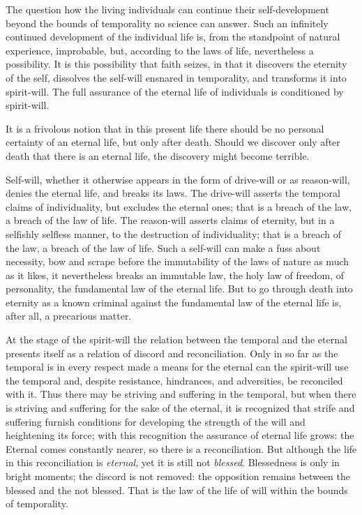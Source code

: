 \documentclass[12pt,a4paper,openany]{book}
\newcommand{\opage}[1]{\marginnote{\footnotesize\textit{[#1]}}}
\begin{document}
The question how the living individuals can
continue their self-development beyond the bounds of temporality
no science can answer. Such an infinitely
continued development of the individual life is, from the standpoint of
natural experience, improbable, but, according to the
laws of life, nevertheless a possibility. It is this possibility
that faith seizes, in that it discovers the eternity of the self, dissolves
the self-will ensnared in temporality, and transforms it into
spirit-will. The full assurance of the eternal life
of individuals is conditioned by spirit-will.

It is a frivolous notion that in this present life there
should be no personal certainty of an
\setcounter{footnote}{0}%
\opage{69}eternal life, but only after death. Should we discover only after
death that there is an eternal life, the discovery might
become terrible.

Self-will, whether it otherwise appears in
the form of drive-will or as reason-will, denies the
eternal life, and breaks its laws. The drive-will asserts
the temporal claims of individuality, but excludes the eternal
ones; that is a breach of the law, a breach of the law of life. The reason-will
asserts claims of eternity, but in a selfishly selfless
manner, to the destruction of individuality; that is a
breach of the law, a breach of the law of life. Such a self-will
can make a fuss about necessity, bow and scrape before the
immutability of the laws of nature as much as it likes, it nevertheless
breaks an immutable law, the holy law of freedom, of personality,
the fundamental law of the eternal life. But to
go through death into eternity as a known
criminal against the fundamental law of the eternal life is, after all, a
precarious matter.

At the stage of the spirit-will the relation between the
temporal and the eternal presents itself as a relation of discord and reconciliation.
Only in so far as the temporal is in every respect
made a means for the eternal can the spirit-will use the
temporal and, despite resistance, hindrances, and adversities,
be reconciled with it. Thus there may be striving and suffering in the
temporal, but when there is striving and suffering for the sake of the eternal,
it is recognized that strife and suffering furnish conditions
for developing the strength of the will and heightening its force; with
this recognition the assurance of eternal life grows: the
Eternal comes constantly nearer, so there is a reconciliation.
But although the life in this reconciliation is \emph{eternal},
yet it is still not \emph{blessed}. Blessedness is only in
bright moments; the discord is not removed: the opposition
remains between the blessed and the not blessed. That is the law of the
life of will within the bounds of temporality.
\end{document}
